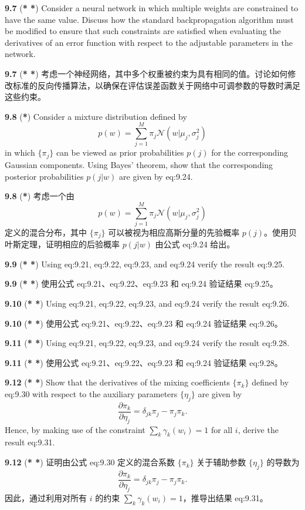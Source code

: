 \documentclass{article}
\begin{document}
\textbf{9.7} (\textbf{* *}) Consider a neural network in which multiple weights are constrained to have the same value. Discuss how the standard backpropagation algorithm must be modified to ensure that such constraints are satisfied when evaluating the derivatives of an error function with respect to the adjustable parameters in the network.

\textbf{9.7} (\textbf{* *}) 考虑一个神经网络，其中多个权重被约束为具有相同的值。讨论如何修改标准的反向传播算法，以确保在评估误差函数关于网络中可调参数的导数时满足这些约束。

\textbf{9.8} (\textbf{*}) Consider a mixture distribution defined by
\[
p(w) = \sum_{j=1}^{M} \pi_j \mathcal{N}(w|\mu_j, \sigma_j^2)
\]
in which $\{\pi_j\}$ can be viewed as prior probabilities $p(j)$ for the corresponding Gaussian components. Using Bayes' theorem, show that the corresponding posterior probabilities $p(j|w)$ are given by {eq:9.24}.

\textbf{9.8} (\textbf{*}) 考虑一个由
\[
p(w) = \sum_{j=1}^{M} \pi_j \mathcal{N}(w|\mu_j, \sigma_j^2)
\]
定义的混合分布，其中 $\{\pi_j\}$ 可以被视为相应高斯分量的先验概率 $p(j)$。使用贝叶斯定理，证明相应的后验概率 $p(j|w)$ 由公式 {eq:9.24} 给出。

\textbf{9.9} (\textbf{* *}) Using {eq:9.21}, {eq:9.22}, {eq:9.23}, and {eq:9.24} verify the result {eq:9.25}.

\textbf{9.9} (\textbf{* *}) 使用公式 {eq:9.21}、{eq:9.22}、{eq:9.23} 和 {eq:9.24} 验证结果 {eq:9.25}。

\textbf{9.10} (\textbf{* *}) Using {eq:9.21}, {eq:9.22}, {eq:9.23}, and {eq:9.24} verify the result {eq:9.26}.

\textbf{9.10} (\textbf{* *}) 使用公式 {eq:9.21}、{eq:9.22}、{eq:9.23} 和 {eq:9.24} 验证结果 {eq:9.26}。

\textbf{9.11} (\textbf{* *}) Using {eq:9.21}, {eq:9.22}, {eq:9.23}, and {eq:9.24} verify the result {eq:9.28}.

\textbf{9.11} (\textbf{* *}) 使用公式 {eq:9.21}、{eq:9.22}、{eq:9.23} 和 {eq:9.24} 验证结果 {eq:9.28}。

\textbf{9.12} (\textbf{* *}) Show that the derivatives of the mixing coefficients $\{\pi_k\}$ defined by {eq:9.30} with respect to the auxiliary parameters $\{\eta_j\}$ are given by
\[
\frac{\partial \pi_k}{\partial \eta_j} = \delta_{jk} \pi_j - \pi_j \pi_k.
\]
Hence, by making use of the constraint $\sum_k \gamma_k(w_i) = 1$ for all $i$, derive the result {eq:9.31}.

\textbf{9.12} (\textbf{* *}) 证明由公式 {eq:9.30} 定义的混合系数 $\{\pi_k\}$ 关于辅助参数 $\{\eta_j\}$ 的导数为
\[
\frac{\partial \pi_k}{\partial \eta_j} = \delta_{jk} \pi_j - \pi_j \pi_k.
\]
因此，通过利用对所有 $i$ 的约束 $\sum_k \gamma_k(w_i) = 1$，推导出结果 {eq:9.31}。
\end{document}
